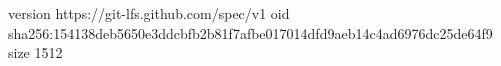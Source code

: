 version https://git-lfs.github.com/spec/v1
oid sha256:154138deb5650e3ddcbfb2b81f7afbe017014dfd9aeb14c4ad6976dc25de64f9
size 1512
